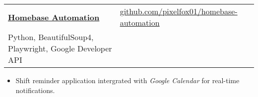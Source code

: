 \documentclass[a4paper, 12pt]{article}
\begin{document}
\begin{tabularx}{\linewidth}{ @{}l X@{} }
    \textcolor{imptextblack}{\underline{\textbf{Homebase Automation}}} & \hfill \href{https://github.com/pixelfox01/HomebaseAutomation}{\small github.com/pixelfox01/homebase-automation} \\
    \small{Python, BeautifulSoup4, Playwright, Google Developer API}                                                                                                                      \\
\end{tabularx}
\vspace{-12pt}
\begin{itemize}[nosep, after=\strut, itemsep=2pt]
    \item Shift reminder application intergrated with
          \textcolor{imptextblack}{\textit{Google Calendar}} for real-time notifications.
\end{itemize}
\end{document}
